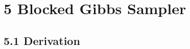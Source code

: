 \documentclass{article}
\begin{document}
\section*{5 Blocked Gibbs Sampler}
\subsection*{5.1 Derivation}
\newcommand{\gammasumwbeta}			{\Gamma( \sum_w \beta)}                %
\newcommand{\gammesumwnkwplusbeta}	{\Gamma (\sum_w n^k_w + \beta)}
\newcommand{\gammankwplusbeta}		{\Gamma(n^k_w + \beta)}
\newcommand{\gammesumwnckwplusbeta}	{\Gamma (\sum_w n^{c,k}_w + \beta)}
\newcommand{\gammanckwplusbeta}		{\Gamma(n^{c,k}_w + \beta)}
\newcommand{\gammasumkalpha}			{\Gamma(\sum_k \alpha)} %
\newcommand{\gammasumkndkplusalpha}	{\Gamma(\sum_k n^d_k + \alpha)}
\newcommand{\gammandkplusalpha}		{\Gamma(n^k_d + \alpha)}
\newcommand{\gammaalpha}				{\Gamma(\alpha)}
\newcommand{\zgoo}					{\frac{\Gamma(n^{k}_{wdi} + 1 + \beta)}{\Gamma(1 + \sum_w n^k_w + \beta)}}
\newcommand{\zgol}					{\frac{\Gamma(n^d_k + 1 + \alpha)}{\Gamma(1 + \sum_k n^d_k + \alpha)}}
\newcommand{\zglo}					{\frac{\Gamma(n^{k}_{wdi} + \beta)}{\Gamma(\sum_w n^k_w + \beta)}}
\newcommand{\zgll}						{\frac{\gammandkplusalpha}{\gammasumkndkplusalpha}}
\newcommand{\zcoo}					{\frac{\Gamma(n^{ck}_{wdi} + 1 + \beta)}{\Gamma(1 + \sum_w n^k_w + \beta)}}
\newcommand{\zcol}					{\frac{\Gamma(n^d_k + 1 + \alpha)}{\Gamma(1 + \sum_k n^d_k + \alpha)}}
\newcommand{\zclo}					{\frac{\Gamma(n^{ck}_{wdi} + \beta)}{\Gamma(\sum_w n^k_w + \beta)}}
\newcommand{\zcll}						{\frac{\gammandkplusalpha}{\gammasumkndkplusalpha}}
\newcommand{\xdione}					{(\lambda)}
\newcommand{\xdizero}					{(1-\lambda)}
\end{document}
